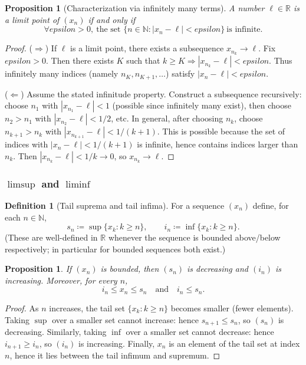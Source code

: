 \documentclass[12pt]{article}
\numberwithin{equation}{section}
\def\abs#1{|#1|}
\def\eps{epsilon}
\newcommand{\RR}{\mathbb{R}}
\newcommand{\NN}{\mathbb{N}}
\DeclarePairedDelimiter{\abs}{\lvert}{\rvert}
\newcommand{\eps}{\varepsilon}               %
\theoremstyle{plain}
\newtheorem{proposition}[theorem]{Proposition}
\theoremstyle{definition}
\newtheorem{definition}[theorem]{Definition}
\theoremstyle{remark}
\begin{document}
\begin{proposition}[Characterization via infinitely many terms]\label{prop:limit-point-char}
A number $\ell\in\RR$ is a limit point of $(x_n)$ if and only if
\[
\forall \eps>0,\ \text{the set } \{n\in\NN:\abs{x_n-\ell}<\eps\}\ \text{is infinite}.
\]
\end{proposition}

\begin{proof}
($\Rightarrow$) If $\ell$ is a limit point, there exists a subsequence $x_{n_k}\to \ell$.
Fix $\eps>0$. Then there exists $K$ such that $k\ge K\Rightarrow \abs{x_{n_k}-\ell}<\eps$.
Thus infinitely many indices (namely $n_K,n_{K+1},\dots$) satisfy $\abs{x_n-\ell}<\eps$.

($\Leftarrow$) Assume the stated infinitude property. Construct a subsequence recursively:
choose $n_1$ with $\abs{x_{n_1}-\ell}<1$ (possible since infinitely many exist),
then choose $n_2>n_1$ with $\abs{x_{n_2}-\ell}<1/2$, etc.
In general, after choosing $n_k$, choose $n_{k+1}>n_k$ with $\abs{x_{n_{k+1}}-\ell}<1/(k+1)$.
This is possible because the set of indices with $\abs{x_n-\ell}<1/(k+1)$ is infinite, hence contains indices larger than $n_k$.
Then $\abs{x_{n_k}-\ell}<1/k\to 0$, so $x_{n_k}\to \ell$.
\end{proof}

\subsubsection{$\limsup$ and $\liminf$}

\begin{definition}[Tail suprema and tail infima]\label{def:tail-sup-inf}
For a sequence $(x_n)$ define, for each $n\in\NN$,
\[
s_n \coloneqq \sup\{x_k:k\ge n\},
\qquad
i_n \coloneqq \inf\{x_k:k\ge n\}.
\]
(These are well-defined in $\RR$ whenever the sequence is bounded above/below respectively; in particular for bounded sequences both exist.)
\end{definition}

\begin{proposition}\label{prop:tail-monotone}
If $(x_n)$ is bounded, then $(s_n)$ is decreasing and $(i_n)$ is increasing.
Moreover, for every $n$,
\[
i_n \le x_n \le s_n
\quad\text{and}\quad
i_n \le s_n.
\]
\end{proposition}

\begin{proof}
As $n$ increases, the tail set $\{x_k:k\ge n\}$ becomes smaller (fewer elements).
Taking $\sup$ over a smaller set cannot increase: hence $s_{n+1}\le s_n$, so $(s_n)$ is decreasing.
Similarly, taking $\inf$ over a smaller set cannot decrease: hence $i_{n+1}\ge i_n$, so $(i_n)$ is increasing.
Finally, $x_n$ is an element of the tail set at index $n$, hence it lies between the tail infimum and supremum.
\end{proof}
\end{document}
